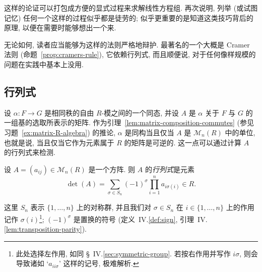 这样的论证可以打包成方便的显式过程来求解线性方程组. 再次说明, 列举 (或试图记忆) 任何一个这样的过程似乎都是徒劳的; 似乎更重要的是知道这类技巧背后的原理, 以便在需要时能够想出一个来.

无论如何, 读者应当能够为这样的法则严格地辩护. 最著名的一个大概是 Cramer 法则 (命题~\ref{prop:cramers-rule}), 它依赖行列式, 而且顺便说, 对于任何像样规模的问题在实践中基本上没用.

\subsection{行列式}
\label{subsec:determinant}

设 $\alpha:F\to G$ 是相同秩的自由 $R$-模之间的一个同态, 并设 $A$ 是 $\alpha$ 关于 $F$ 与 $G$ 的一组基的选取所表示的矩阵. 作为引理~\ref{lem:matrix-composition-commutes} (参见习题~\ref{ex:matrix-R-algebra}) 的推论, $\alpha$ 是同构当且仅当 $A$ 是 $\mathcal{M}_n(R)$ 中的单位, 也就是说, 当且仅当它作为元素属于 $R$ 的矩阵是可逆的. 这一点可以通过计算 $A$ 的行列式来检测.

\begin{definition}\label{def:determinant}
设 $A=(a_{ij})\in\mathcal{M}_n(R)$ 是一个方阵. 则 $A$ 的\emph{行列式}是元素
\[
\det(A)=\sum_{\sigma\in S_n}(-1)^\sigma\prod_{i=1}^n a_{i\sigma(i)}\in R.
\]
\end{definition}

这里 $S_n$ 表示 $\{1,\ldots,n\}$ 上的对称群, 并且我们对 $\sigma\in S_n$ 在 $i\in\{1,\ldots,n\}$ 上的作用记作 $\sigma(i)$\footnote{此处选择左作用, 如同 \S~IV.\ref{sec:symmetric-group}. 若按右作用并写作 $i\sigma$, 则会导致诸如 `$a_{ii\sigma}$' 这样的记号, 极难解析.}; $(-1)^\sigma$ 是置换的符号 (定义~IV.\ref{def:sign}, 引理~IV.\ref{lem:transposition-parity}).

